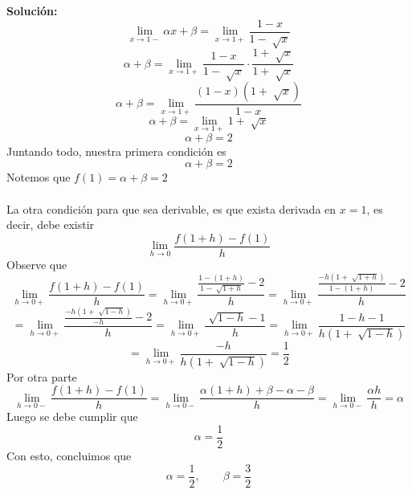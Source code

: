 \documentclass[12pt]{article}
\newenvironment{solucion}
{\begin{mdframed}[backgroundcolor=black!10]
		{\bf Solución:}\\
	}
	{
	\end{mdframed}
}
\newenvironment{preguntas}
{\begin{enumerate}\itemsep12pt
	}
	{
	\end{enumerate}
}
\newcommand{\ra}{\rightarrow}
\begin{document}
\begin{preguntas}
\begin{solucion}
$$\lim\limits_{x\ra 1-} \alpha x + \beta = \lim\limits_{x\ra 1+} \dfrac{1-x}{1-\sqrt[]{x}} $$
$$\alpha + \beta = \lim\limits_{x\ra 1+} \dfrac{1-x}{1-\sqrt[]{x}} \cdot \dfrac{1+\sqrt[]{x}}{1+\sqrt[]{x}} $$
$$\alpha + \beta = \lim\limits_{x\ra 1+} \dfrac{(1-x)(1+\sqrt[]{x})}{1-x}$$
$$\alpha + \beta = \lim\limits_{x\ra 1+} 1+\sqrt[]{x}$$
$$\alpha + \beta = 2$$
Juntando todo, nuestra primera condición es
$$\alpha + \beta = 2$$
Notemos que $f(1) = \alpha + \beta = 2$\\
\\
La otra condición para que sea derivable, es que exista derivada en $x=1$, es decir, debe existir
$$\lim\limits_{h\ra 0} \dfrac{f(1+h) - f(1)}{h}$$
Observe que
$$\lim\limits_{h\ra 0+} \dfrac{f(1+h) - f(1)}{h} = 
\lim\limits_{h\ra 0+} \dfrac{\frac{1-(1+h)}{1-\sqrt[]{1+h}}- 2}{h} = 
\lim\limits_{h\ra 0+} \dfrac{\frac{-h(1+\sqrt[]{1+h})}{1-(1+h)}- 2}{h}  $$
$$ = 
\lim\limits_{h\ra 0+} \dfrac{\frac{-h(1+\sqrt[]{1-h})}{-h}- 2}{h}= 
\lim\limits_{h\ra 0+} \dfrac{\sqrt[]{1-h} - 1}{h} = 
\lim\limits_{h\ra 0+} \dfrac{1-h - 1}{h(1+\sqrt[]{1-h})}$$
$$ = 
\lim\limits_{h\ra 0+} \dfrac{-h}{h(1+\sqrt[]{1-h})} =
\dfrac{1}{2}$$
Por otra parte
$$\lim\limits_{h\ra 0-} \dfrac{f(1+h) - f(1)}{h} = 
\lim\limits_{h\ra 0-} \dfrac{\alpha(1+h) +\beta - \alpha - \beta}{h} = 
\lim\limits_{h\ra 0-} \dfrac{\alpha h }{h} =
\alpha
$$
Luego se debe cumplir que
$$\alpha = \dfrac{1}{2}$$
Con esto, concluimos que
$$\alpha = \dfrac{1}{2}, \qquad \beta = \dfrac{3}{2}$$
\end{solucion}
\end{preguntas}
\end{document}
